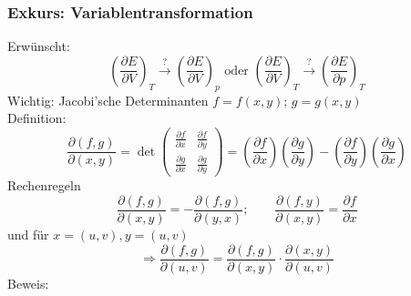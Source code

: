 \subsubsection{Exkurs: Variablentransformation}
Erwünscht:
\begin{equation}
  \left( \frac{\partial E}{\partial V} \right)_T \overset{?}{\rightarrow} \left( \frac{\partial E}{\partial V} \right)_p
  \text{ oder }
  \left( \frac{\partial E}{\partial V} \right)_T \overset{?}{\rightarrow} \left( \frac{\partial E}{\partial p} \right)_T
\end{equation}
Wichtig: Jacobi'sche Determinanten $f=f(x, y)$; $g=g(x, y)$ \\
Definition:
\begin{equation}
  \frac{\partial (f, g)}{\partial(x, y)} = \det 
  \begin{pmatrix}
  \frac{\partial f}{\partial x} & \frac{\partial f}{\partial y} \\
  \frac{\partial g}{\partial x} & \frac{\partial g}{\partial y} 
  \end{pmatrix}
  = \left( \frac{\partial f}{\partial x} \right) \left( \frac{\partial g}{\partial
  y} \right) - \left( \frac{\partial f}{\partial y} \right) \left( \frac{\partial g}{\partial x} \right)
\end{equation}
Rechenregeln
\begin{equation}
  \frac{\partial(f, g)}{\partial(x, y)} = -\frac{\partial(f, g)}{\partial(y, x)}; \qquad
  \frac{\partial(f, y)}{\partial(x, y)} = \frac{\partial f}{\partial x}
\end{equation}
und für $x=(u, v), y=(u, v)$
\begin{equation}
  \Rightarrow \frac{\partial(f, g)}{\partial(u, v)} = \frac{\partial(f, g)}{\partial(x, y)} \cdot \frac{\partial(x, y)}{\partial(u, v)}
\end{equation}
Beweis:

